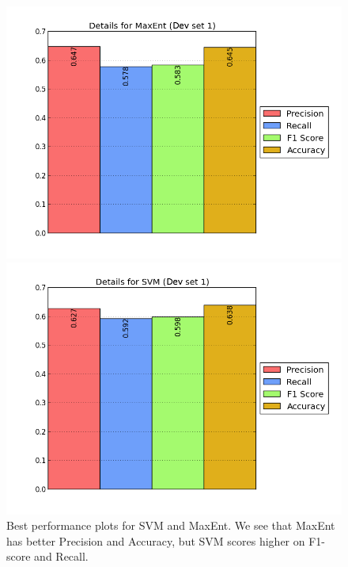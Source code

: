 \begin{figure}[!htb]
	\centering
	\begin{minipage}{.45\linewidth}
		\includegraphics[width=\linewidth]{../img/plots/analysis/maxent_stats_best.png}
	\end{minipage}
	\hspace{0.05\linewidth}
	\begin{minipage}{.45\linewidth}
		\includegraphics[width=\linewidth]{../img/plots/analysis/svm_stats_best.png}
	\end{minipage}
	\caption[Best performance plots for SVM and MaxEnt]{Best performance plots for SVM and MaxEnt. We see that MaxEnt has better Precision and Accuracy, but SVM scores higher on F1-score and Recall.}
	\label{fig:best_result}
\end{figure}

